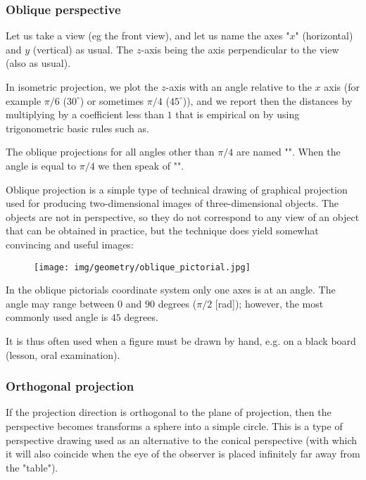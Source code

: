 	\subsubsection{Oblique perspective}
	Let us take a view (eg the front view), and let us name the axes "$x$" (horizontal) and $y$ (vertical) as usual. The $z$-axis being the axis perpendicular to the view (also as usual).

	In isometric projection, we plot the $z$-axis with an angle relative to the $x$ axis (for example $\pi/6$ ($30^\circ$) or sometimes $\pi/4$ ($45^\circ$)), and we report then the distances by multiplying by a coefficient less than $1$ that is empirical on by using trigonometric basic rules such as.
	\begin{tcolorbox}[title=Remark,colframe=black,arc=10pt]
	The oblique projections for all angles other than $\pi/4$ are named "". When the angle is equal to $\pi/4$ we then speak of "".	
	\end{tcolorbox}
	
	Oblique projection is a simple type of technical drawing of graphical projection used for producing two-dimensional images of three-dimensional objects. The objects are not in perspective, so they do not correspond to any view of an object that can be obtained in practice, but the technique does yield somewhat convincing and useful images:
	\begin{figure}[H]
		\centering
		\texttt{[image: img/geometry/oblique\_pictorial.jpg]}
	\end{figure}

	In the oblique pictorials coordinate system only one axes is at an angle. The angle may range between $0$ and $90$ degrees ($\pi/2$ [rad]); however, the most commonly used angle is $45$ degrees.

 	It is thus often used when a figure must be drawn by hand, e.g. on a black board (lesson, oral examination).
 	
 	\pagebreak
 	\subsubsection{Orthogonal projection}
	If the projection direction is orthogonal to the plane of projection, then the perspective becomes transforms a sphere into a simple circle. This is a type of perspective drawing used as an alternative to the conical perspective (with which it will also coincide when the eye of the observer is placed infinitely far away from the "table").

